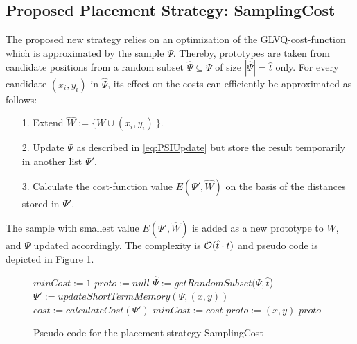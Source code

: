 \documentclass[conference]{IEEEtran}
\begin{document}
\subsection{Proposed Placement Strategy: SamplingCost}
The proposed new strategy relies on an optimization of the GLVQ-cost-function which is approximated by
the sample $\Psi$. Thereby, prototypes are taken from candidate positions
from a random subset $\hat{\Psi}\subseteq \Psi$ of size $|\hat{\Psi}|=\hat{t}$ only.
For every candidate $(x_i,y_i)$ in $\hat{\Psi}$,
its effect on the costs can efficiently be approximated as follows:
\begin{itemize}
\item[1.] 
Extend $\hat{W}:= \{W\cup (x_i,y_i)\ \}$.
\item[2.]
Update ${\Psi}$ as described in \eqref{eq:PSIUpdate} but store the result temporarily in another list ${\Psi'}$.
\item[3.]
Calculate the cost-function value $E(\Psi', \hat{W})$ on the basis of the distances stored in $\Psi'$. 
\end{itemize}
The sample with smallest value $E(\Psi', \hat{W})$  is added as a new prototype to $W$,
and $\Psi$ updated accordingly. The complexity is ${\cal O}(\hat{t}\cdot t)$ and pseudo code is depicted in Figure \ref{fig:SamplingCost}.
\begin{figure}
\begin{algorithmic}
  \State $minCost := 1$
  \State $proto := null$
  \State $\hat{\Psi} := getRandomSubset(\Psi, \hat{t}$)  
    \State ${\Psi'} := updateShortTermMemory(\Psi, (x,y))$
    \State $cost := calculateCost(\Psi')$
      \State $minCost := cost$
      \State $proto := (x,y)$
    \EndIf
  \EndFor
  \State \Return $proto$
  \EndFunction
\end{algorithmic}
\caption{Pseudo code for the placement strategy SamplingCost} 
\label{fig:SamplingCost}
\end{figure}
\end{document}
